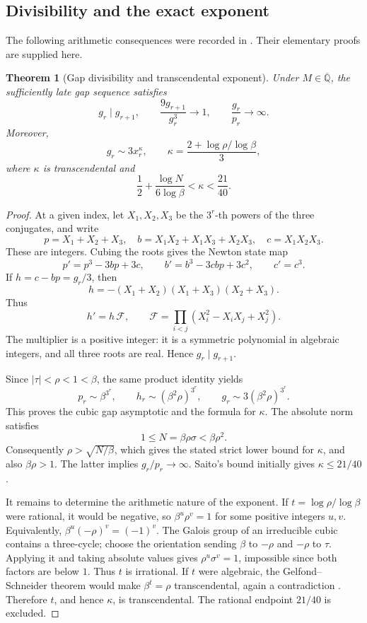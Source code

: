 \documentclass[11pt,a4paper]{article}
\numberwithin{equation}{section}
\newtheorem{theorem}{Theorem}[section]
\theoremstyle{definition}
\theoremstyle{remark}
\newcommand{\A}{\overline{\mathbb Q}}
\begin{document}
\subsection{Divisibility and the exact exponent}
\label{mi:gaps}

The following arithmetic consequences were recorded in
\cite{VMRC010}. Their elementary proofs are supplied here.

\begin{theorem}[Gap divisibility and transcendental exponent]
\label{mi:gap-theorem}
Under \(M\in\A\), the sufficiently late gap sequence satisfies
\[
 g_r\mid g_{r+1},\qquad
 \frac{9g_{r+1}}{g_r^3}\longrightarrow1,\qquad
 \frac{g_r}{p_r}\longrightarrow\infty.
\]
Moreover,
\[
 g_r\sim3x_r^\kappa,\qquad
 \kappa=\frac{2+\log\rho/\log\beta}{3},
\]
where \(\kappa\) is transcendental and
\[
 \frac12+\frac{\log N}{6\log\beta}
 <\kappa<\frac{21}{40}.
\]
\end{theorem}

\begin{proof}
At a given index, let \(X_1,X_2,X_3\) be the \(3^r\)-th powers
of the three conjugates, and write
\[
 p=X_1+X_2+X_3,\quad
 b=X_1X_2+X_1X_3+X_2X_3,\quad
 c=X_1X_2X_3.
\]
These are integers. Cubing the roots gives the Newton state map
\begin{equation}\label{mi:newton}
 p'=p^3-3bp+3c,\qquad
 b'=b^3-3cbp+3c^2,\qquad c'=c^3.
\end{equation}
If \(h=c-bp=g_r/3\), then
\[
 h=-(X_1+X_2)(X_1+X_3)(X_2+X_3).
\]
Thus
\[
 h'=h\,\mathcal F,\qquad
 \mathcal F=\prod_{i<j}(X_i^2-X_iX_j+X_j^2).
\]
The multiplier is a positive integer: it is a symmetric
polynomial in algebraic integers, and all three roots are real.
Hence \(g_r\mid g_{r+1}\).

Since \(|\tau|<\rho<1<\beta\), the same product identity yields
\[
 p_r\sim\beta^{3^r},\qquad
 h_r\sim(\beta^2\rho)^{3^r},\qquad
 g_r\sim3(\beta^2\rho)^{3^r}.
\]
This proves the cubic gap asymptotic and the formula for
\(\kappa\). The absolute norm satisfies
\[
 1\le N=\beta\rho\sigma<\beta\rho^2.
\]
Consequently
\(\rho>\sqrt{N/\beta}\), which gives the stated strict lower
bound for \(\kappa\), and also \(\beta\rho>1\).
The latter implies \(g_r/p_r\to\infty\).
Saito's bound initially gives \(\kappa\le21/40\).

It remains to determine the arithmetic nature of the exponent.
If \(t=\log\rho/\log\beta\) were rational, it would be negative,
so \(\beta^u\rho^v=1\) for some positive integers \(u,v\).
Equivalently, \(\beta^u(-\rho)^v=(-1)^v\).
The Galois group of an irreducible cubic contains a three-cycle;
choose the orientation sending \(\beta\) to \(-\rho\) and
\(-\rho\) to \(\tau\). Applying it and taking absolute values gives
\(\rho^u\sigma^v=1\), impossible since both factors are below \(1\).
Thus \(t\) is irrational.
If \(t\) were algebraic, the Gelfond--Schneider theorem would
make \(\beta^t=\rho\) transcendental, again a contradiction
\cite{Schneider1934}. Therefore \(t\), and hence \(\kappa\), is
transcendental. The rational endpoint \(21/40\) is excluded.
\end{proof}
\end{document}
